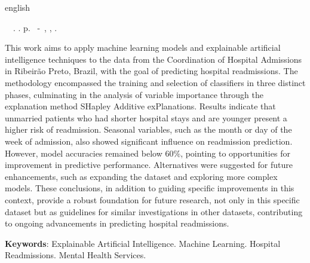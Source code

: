\begin{resumo}[Abstract]
 \begin{otherlanguage*}{english}
	\begin{flushleft} 
		\setlength{\absparsep}{0pt} %
 		\SingleSpacing  		\imprimirautorabr~~\textbf{\imprimirtitleabstract}.	\imprimirdata.  \pageref{LastPage}p. 
		\imprimirtipotrabalhoabs~-~\imprimirinstituicao, \imprimirlocal, 	\imprimirdata. 
 	\end{flushleft}
	\OnehalfSpacing 
	This work aims to apply machine learning models and explainable artificial intelligence techniques to the data from the Coordination of Hospital Admissions in Ribeirão Preto, Brazil, with the goal of predicting hospital readmissions. The methodology encompassed the training and selection of classifiers in three distinct phases, culminating in the analysis of variable importance through the explanation method SHapley Additive exPlanations. Results indicate that unmarried patients who had shorter hospital stays and are younger present a higher risk of readmission. Seasonal variables, such as the month or day of the week of admission, also showed significant influence on readmission prediction. However, model accuracies remained below 60\%, pointing to opportunities for improvement in predictive performance. Alternatives were suggested for future enhancements, such as expanding the dataset and exploring more complex models. These conclusions, in addition to guiding specific improvements in this context, provide a robust foundation for future research, not only in this specific dataset but as guidelines for similar investigations in other datasets, contributing to ongoing advancements in predicting hospital readmissions.
	
	\vspace{\onelineskip}
	\noindent 
	\textbf{Keywords}: Explainable Artificial Intelligence. Machine Learning. Hospital Readmissions. Mental Health Services.
 \end{otherlanguage*}
\end{resumo}